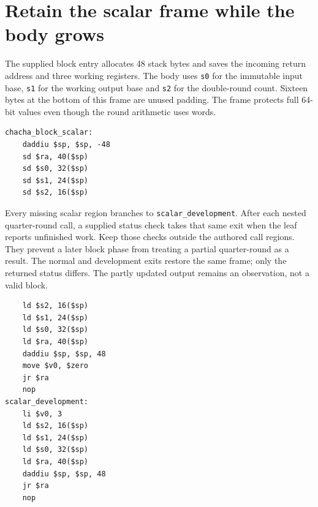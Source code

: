 \section{Retain the scalar frame while the body grows}
The supplied block entry allocates 48 stack bytes and saves the incoming return
address and three working registers. The body uses \texttt{s0} for the immutable
input base, \texttt{s1} for the working output base and \texttt{s2} for the
double-round count. Sixteen bytes at the bottom of this frame are unused padding.
The frame protects full 64-bit values even though the round arithmetic uses words.

\begin{verbatim}
chacha_block_scalar:
    daddiu $sp, $sp, -48
    sd $ra, 40($sp)
    sd $s0, 32($sp)
    sd $s1, 24($sp)
    sd $s2, 16($sp)
\end{verbatim}

Every missing scalar region branches to \texttt{scalar\_development}. After each
nested quarter-round call, a supplied status check takes that same exit when the
leaf reports unfinished work. Keep those checks outside the authored call regions.
They prevent a later block phase from treating a partial quarter-round as a result.
The normal and development exits restore the same frame; only the returned status
differs. The partly updated output remains an observation, not a valid block.

\begin{verbatim}
    ld $s2, 16($sp)
    ld $s1, 24($sp)
    ld $s0, 32($sp)
    ld $ra, 40($sp)
    daddiu $sp, $sp, 48
    move $v0, $zero
    jr $ra
    nop
scalar_development:
    li $v0, 3
    ld $s2, 16($sp)
    ld $s1, 24($sp)
    ld $s0, 32($sp)
    ld $ra, 40($sp)
    daddiu $sp, $sp, 48
    jr $ra
    nop
\end{verbatim}
